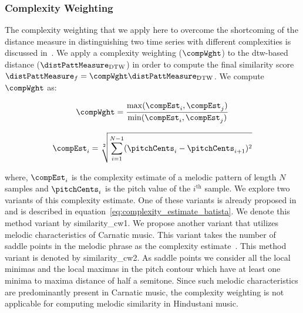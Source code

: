 \subsubsection{Complexity Weighting}
\label{sec:patterns_improving_similarity_complexity_invariance_weighting}

The complexity weighting that we apply here to overcome the shortcoming of the distance measure in distinguishing two time series with different complexities is discussed in~\cite{batista2011complexity}. We apply a complexity weighting ($\compWght$) to the \gls{dtw}-based distance ($\distPattMeasure_\mathrm{DTW}$) in order to compute the final similarity score $\distPattMeasure_{f}=\compWght \distPattMeasure_\mathrm{DTW}$. We compute $\compWght$ as:


\begin{equation}
\begin{gathered}
\compWght = \frac{\max(\compEst_i,\compEst_j)}{\min(\compEst_i, \compEst_j)} \\
\end{gathered}
\label{eq:complexity_weighing}
\end{equation}

\begin{equation}
\begin{gathered}
\compEst_i = \sqrt[2]{\sum_{i=1}^{N-1} (\pitchCents_{i}-\pitchCents_{i+1})^2}\\
\end{gathered}
\label{eq:complexity_estimate_batista}
\end{equation}

\noindent where, $\compEst_i$ is the complexity estimate of a melodic pattern of length $N$ samples and $\pitchCents_i$ is the pitch value of the $i^{\mathrm{th}}$ sample. We explore two variants of this complexity estimate. One of these variants is already proposed in~\cite{batista2011complexity} and is described in equation~\ref{eq:complexity_estimate_batista}. We denote this method variant by \acrshort{similarity_cw1}. We propose another variant that utilizes melodic characteristics of Carnatic music. This variant takes the number of saddle points in the melodic phrase as the complexity estimate~\citep{Ishwar2013}. This method variant is denoted by \acrshort{similarity_cw2}. As saddle points we consider all the local minimas and the local maximas in the pitch contour which have at least one minima to maxima distance of half a semitone. Since such melodic characteristics are predominantly present in Carnatic music, the complexity weighting is not applicable for computing melodic similarity in Hindustani music.


